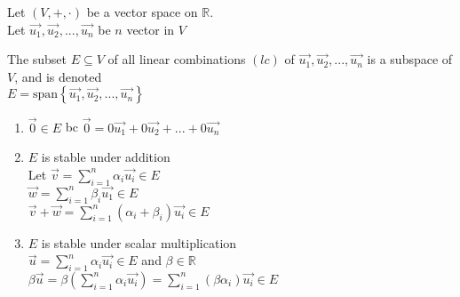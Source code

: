 \documentclass[12pt]{article}
\renewcommand{\v}[1]{\overrightarrow{#1}}
\newcommand{\real}[0]{\mathbb{R}}
\newenvironment{proof}{\block[Proof]}{\endblock}
\newenvironment{proposition}{\block[Proposition]}{\endblock}
\newcommand{\bb}[1]{\left\{#1\right\}}
\newcommand{\ssum}[0]{\sum_{i=1}^n}
\newcommand{\sspan}[1]{\text{span}\bb{#1}}
\begin{document}
	Let $(V, +, \cdot)$ be a vector space on $\real$. \\
	Let $\v{u_1}, \v{u_2}, ..., \v{u_n}$ be $n$ vector in $V$ 
	
	\begin{proposition}
		The subset $E \subseteq V$ of all linear combinations $(lc)$ of $\v{u_1}, \v{u_2}, ..., \v{u_n}$ is a subspace of $V$, and is denoted \\
		$E = \sspan{\v{u_1}, \v{u_2}, ..., \v{u_n}}$
		
		\begin{proof}
			\begin{enumerate}
				\item $\v{0} \in E$ bc $\v{0} = 0 \v{u_1} + 0 \v{u_2} + ... + 0 \v{u_n}$
				\item $E$ is stable under addition \\
				Let $\v{v} = \sum_{i=1}^n \alpha_i \v{u_i} \in E$ \\
				$\v{w} = \sum_{i=1}^n \beta_i \v{u_1} \in E$ \\
				$\v{v} + \v{w} = \sum_{i=1}^n (\alpha_i + \beta_i) \v{u_i} \in E$
				\item $E$ is stable under scalar multiplication \\
				$\v{u} =  \ssum \alpha_i \v{u_i} \in E$ and $\beta \in \real$ \\
				$\beta \v{u} = \beta(\ssum \alpha_i \v{u_i}) = \sum_{i=1}^n (\beta \alpha_i) \v{u_i} \in E$
			\end{enumerate}
		\end{proof}
	\end{proposition}
	
\end{document}
